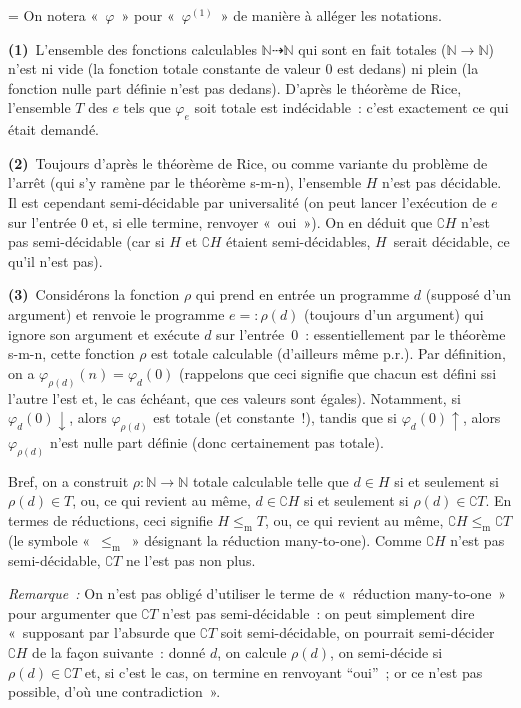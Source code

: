 \documentclass[12pt,a4paper]{article}
\theoremstyle{definition}
\newif\ifcorrige
\newenvironment{corrige}%
{\ifcorrige\relax\else\setbox0=\vbox\bgroup\fi%
\smallbreak\footnotesize\noindent{\underbar{\textit{Corrigé.}}\quad}}
{{\hbox{}\nobreak\hfill\checkmark}%
\ifcorrige\relax\else\egroup\fi\par}
\begin{document}
\begin{corrige}
On notera « $\varphi$ » pour « $\varphi^{(1)}$ » de manière à alléger
les notations.

\textbf{(1)} L'ensemble des fonctions calculables $\mathbb{N}
\dasharrow \mathbb{N}$ qui sont en fait totales ($\mathbb{N} \to
\mathbb{N}$) n'est ni vide (la fonction totale constante de valeur $0$
est dedans) ni plein (la fonction nulle part définie n'est pas
dedans).  D'après le théorème de Rice, l'ensemble $T$ des $e$ tels que
$\varphi_e$ soit totale est indécidable : c'est exactement ce qui
était demandé.

\textbf{(2)} Toujours d'après le théorème de Rice, ou comme variante
du problème de l'arrêt (qui s'y ramène par le théorème s-m-n),
l'ensemble $H$ n'est pas décidable.  Il est cependant semi-décidable
par universalité (on peut lancer l'exécution de $e$ sur l'entrée $0$
et, si elle termine, renvoyer « oui »).  On en déduit que $\complement
H$ n'est pas semi-décidable (car si $H$ et $\complement H$ étaient
semi-décidables, $H$ serait décidable, ce qu'il n'est pas).

\textbf{(3)} Considérons la fonction $\rho$ qui prend en entrée un
programme $d$ (supposé d'un argument) et renvoie le programme $e =:
\rho(d)$ (toujours d'un argument) qui ignore son argument et exécute
$d$ sur l'entrée $0$ : essentiellement par le théorème s-m-n, cette
fonction $\rho$ est totale calculable (d'ailleurs même p.r.).  Par
définition, on a $\varphi_{\rho(d)}(n) = \varphi_d(0)$ (rappelons que
ceci signifie que chacun est défini ssi l'autre l'est et, le cas
échéant, que ces valeurs sont égales).  Notamment, si
$\varphi_d(0)\downarrow$, alors $\varphi_{\rho(d)}$ est totale (et
constante !), tandis que si $\varphi_d(0)\uparrow$, alors
$\varphi_{\rho(d)}$ n'est nulle part définie (donc certainement pas
totale).

Bref, on a construit $\rho\colon\mathbb{N}\to\mathbb{N}$ totale
calculable telle que $d \in H$ si et seulement si $\rho(d) \in T$, ou,
ce qui revient au même, $d \in \complement H$ si et seulement si
$\rho(d) \in \complement T$.  En termes de réductions, ceci signifie
$H \mathrel{\leq_\mathrm{m}} T$, ou, ce qui revient au même,
$\complement H \mathrel{\leq_\mathrm{m}} \complement T$ (le symbole
« $\mathrel{\leq_\mathrm{m}}$ » désignant la réduction many-to-one).
Comme $\complement H$ n'est pas semi-décidable, $\complement T$ ne
l'est pas non plus.

\emph{Remarque :} On n'est pas obligé d'utiliser le terme de
« réduction many-to-one » pour argumenter que $\complement T$ n'est
pas semi-décidable : on peut simplement dire « supposant par l'absurde
que $\complement T$ soit semi-décidable, on pourrait semi-décider
$\complement H$ de la façon suivante : donné $d$, on calcule
$\rho(d)$, on semi-décide si $\rho(d) \in \complement T$ et, si c'est
le cas, on termine en renvoyant “oui” ; or ce n'est pas possible, d'où
une contradiction ».


\end{corrige}
\end{document}
